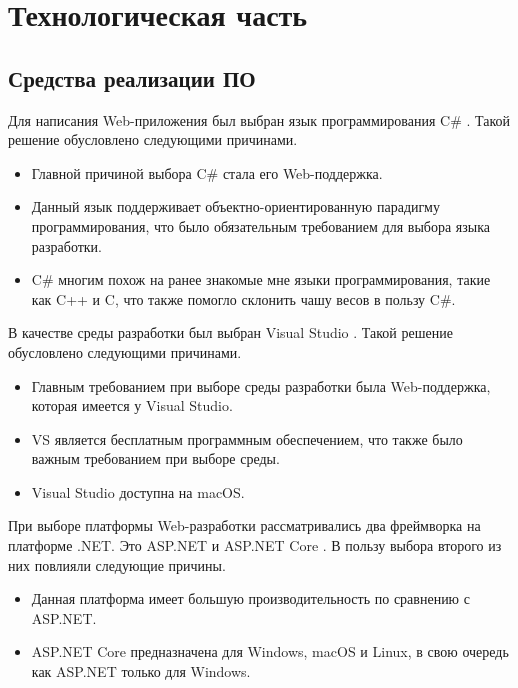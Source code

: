 \chapter{Технологическая часть}

\section{Средства реализации ПО}

Для написания Web-приложения был выбран язык программирования C\# \cite{csharp}. Такой решение обусловлено следующими причинами.

\begin{itemize}
    \item Главной причиной выбора C\# стала его Web-поддержка.
    \item Данный язык поддерживает объектно-ориентированную парадигму программирования, что было обязательным требованием для выбора языка разработки.
    \item C\# многим похож на ранее знакомые мне языки программирования, такие как C++ и C, что также помогло склонить чашу весов в пользу C\#. 
\end{itemize}

В качестве среды разработки был выбран Visual Studio \cite{vs}. Такой решение обусловлено следующими причинами.

\begin{itemize}
	\item Главным требованием при выборе среды разработки была Web-поддержка, которая имеется у Visual Studio.
	\item VS является бесплатным программным обеспечением, что также было важным требованием при выборе среды.
	\item Visual Studio доступна на macOS.
\end{itemize}

При выборе платформы Web-разработки рассматривались два фреймворка на платформе .NET. Это ASP.NET \cite{asp_net} и ASP.NET Core \cite{asp_net_core}. В пользу выбора второго из них повлияли следующие причины.

\begin{itemize}
    \item Данная платформа имеет большую производительность по сравнению с ASP.NET.
    \item ASP.NET Core предназначена для Windows, macOS и Linux, в свою очередь как ASP.NET только для Windows.
\end{itemize}

